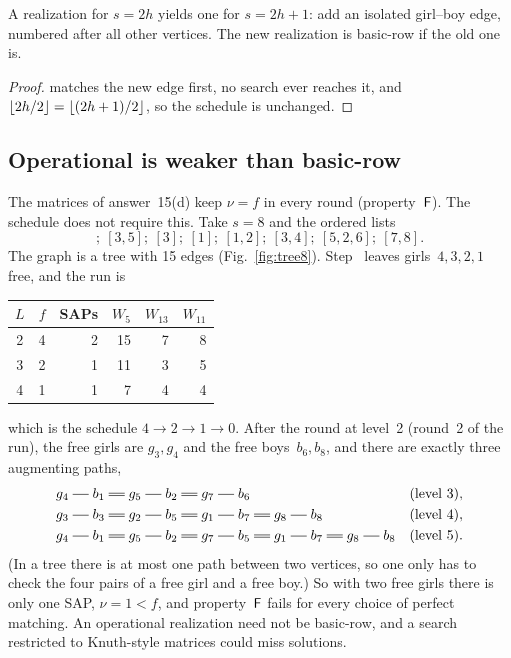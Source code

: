 \begin{proposition}
\label{prop:odd}
A realization for $s=2h$ yields one for $s=2h+1$: add an isolated
girl--boy edge, numbered after all other vertices. The new realization is
basic-row if the old one is.
\end{proposition}

\begin{proof}
 matches the new edge first, no search ever reaches it, and
$\lfloor2h/2\rfloor=\lfloor(2h+1)/2\rfloor$, so the schedule is unchanged.
\end{proof}

\subsection{Operational is weaker than basic-row}
\label{sec:no-cover}

The matrices of answer~15(d) keep $\nu=f$ in every round
(property~$\mathsf F$). The schedule does not require this. Take $s=8$ and the
ordered lists
\begin{equation}
  [5,7];\ [3,5];\ [3];\ [1];\ [1,2];\ [3,4];\ [5,2,6];\ [7,8].
  \label{eq:tree8}
\end{equation}
The graph is a tree with 15 edges (Fig.~\ref{fig:tree8}). Step~ leaves
girls~$4,3,2,1$ free, and the run is
\begin{center}\small
\begin{tabular}{crrrrr}
\toprule
$L$&$f$&SAPs&$W_5$&$W_{13}$&$W_{11}$\\
\midrule
2&4&2&15&7&8\\
3&2&1&11&3&5\\
4&1&1&7&4&4\\
\bottomrule
\end{tabular}
\end{center}
which is the schedule $4\to2\to1\to0$. After the round at level~2 (round~2
of the run), the free girls are $g_3,g_4$ and the free boys~$b_6,b_8$, and
there are exactly three augmenting paths,
\begin{align*}
 &g_4\sg b_1\db g_5\sg b_2\db g_7\sg b_6 &&(\text{level }3),\\
 &g_3\sg b_3\db g_2\sg b_5\db g_1\sg b_7\db g_8\sg b_8 &&(\text{level }4),\\
 &g_4\sg b_1\db g_5\sg b_2\db g_7\sg b_5\db g_1\sg b_7\db g_8\sg b_8 &&(\text{level }5).
\end{align*}
(In a tree there is at most one path between two vertices, so one only
has to check the four pairs of a free girl and a free boy.) So with two
free girls there is only one SAP, $\nu=1<f$, and property~$\mathsf F$ fails for
every choice of perfect matching. An operational realization need not be
basic-row, and a search restricted to Knuth-style matrices could miss
solutions.

